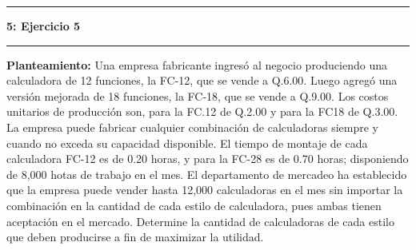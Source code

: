 \documentclass[11pt]{article}
\newcommand\problema[2]{\vspace{.12in}\hrule\textbf{#1: #2}\vspace{.5em}\hrule\vspace{.10in}}
\newcommand\planteamiento{\vspace{.10in}\textbf{Planteamiento: }}
\begin{document}
\problema{5}{Ejercicio 5}
\planteamiento
Una empresa fabricante ingresó al negocio produciendo una calculadora de 12 funciones, la FC-12, que se vende a Q.6.00. Luego agregó una versión mejorada de 18 funciones, la FC-18, que se vende a Q.9.00. Los costos unitarios de producción son, para la FC.12 de Q.2.00 y para la FC18 de Q.3.00. La empresa puede fabricar cualquier combinación de calculadoras siempre y cuando no exceda su capacidad disponible. El tiempo de montaje de cada calculadora FC-12 es de 0.20 horas, y para la FC-28 es de 0.70 horas; disponiendo de 8,000 hotas de trabajo en el mes. El departamento de mercadeo ha establecido que la empresa puede vender hasta 12,000 calculadoras en el mes sin importar la combinación en la cantidad de cada estilo de calculadora, pues ambas tienen aceptación en el mercado. Determine la cantidad de calculadoras de cada estilo que deben producirse a fin de maximizar la utilidad.
\end{document}
